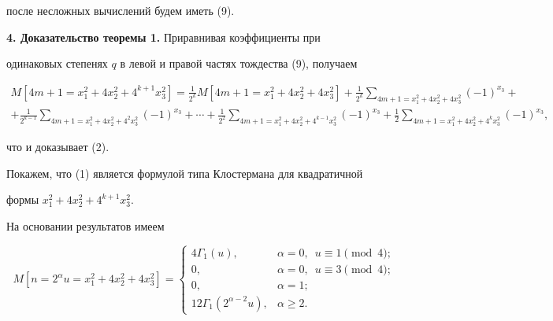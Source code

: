 после несложных вычислений будем иметь (9).


\medskip





{\bf 4. Доказательство теоремы 1.} Приравнивая коэффициенты при


одинаковых степенях $q$ в левой и правой частях тождества (9), получаем


\begin{multline*}


M[4m+1=x^2_1+4x^2_2+4^{k+1}x^2_3]=


\frac{1}{2^k}M[4m+1=x^2_1+4x^2_2+4x^2_3]+\frac{1}{2^k}


\sum_{4m+1=x^2_1+4x^2_2+4x^2_3}(-1)^{x_3}+ \\


+\frac{1}{2^{k-1}}


\sum_{4m+1=x^2_1+4x^2_2+4^2x^2_3}(-1)^{x_3}+\dotsb+


\frac{1}{2^2}\sum_{4m+1=x^2_1+4x^2_2+4^{k-1}x^2_3}(-1)^{x_3}+


\frac{1}{2}\sum_{4m+1=x^2_1+4x^2_2+4^k x^2_3}(-1)^{x_3},


\end{multline*}


что и доказывает (2).





Покажем, что (1) является формулой типа Клостермана для квадратичной


формы $x^2_1+4x^2_2+4^{k+1}x^2_3$.


На основании результатов \cite{K10} имеем


\begin{equation}


M[n=2^\alpha u=x^2_1+4x^2_2+4x^2_3]=


\begin{cases}


4\Gamma_1(u), & \alpha=0,\ \; u\equiv 1\pmod{4};\\


0, & \alpha=0, \ \;u\equiv 3\pmod{4};\\


0, & \alpha=1;\\


12\Gamma_1(2^{\alpha-2}u), & \alpha\ge 2.


\end{cases}


\end{equation}





